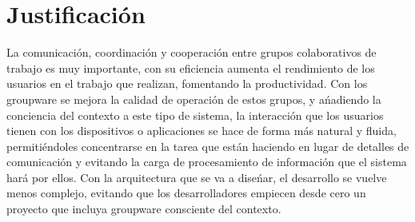 \section{Justificaci\'on}
La comunicaci\'on, coordinaci\'on y cooperaci\'on entre grupos colaborativos de trabajo es muy importante, con su eficiencia aumenta el rendimiento de los usuarios en el trabajo que realizan, fomentando la productividad. Con los groupware se mejora la calidad de operaci\'on de estos grupos, y a\'nadiendo la conciencia del contexto a este tipo de sistema, la interacci\'on que los usuarios tienen con los dispositivos o aplicaciones se hace de forma m\'as natural y fluida, permiti\'endoles concentrarse en la tarea que est\'an haciendo en lugar de detalles de comunicaci\'on y evitando la carga de procesamiento de informaci\'on que el sistema har\'a por ellos. Con la arquitectura que se va a dise\'nar, el desarrollo se vuelve menos complejo, evitando que los desarrolladores empiecen desde cero un proyecto que incluya groupware consciente del contexto.